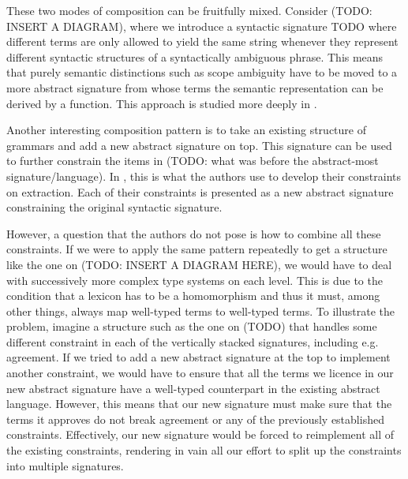 These two modes of composition can be fruitfully mixed. Consider (TODO:
INSERT A DIAGRAM), where we introduce a syntactic signature TODO where
different terms are only allowed to yield the same string whenever they
represent different syntactic structures of a syntactically ambiguous
phrase. This means that purely semantic distinctions such as scope
ambiguity have to be moved to a more abstract signature from whose terms
the semantic representation can be derived by a function. This approach
is studied more deeply in \cite{pogodalla2007generalizing}.

Another interesting composition pattern is to take an existing structure
of grammars and add a new abstract signature on top. This signature can
be used to further constrain the items in (TODO: what was before the
abstract-most signature/language). In \cite{pogodalla2012controlling},
this is what the authors use to develop their constraints on
extraction. Each of their constraints is presented as a new abstract
signature constraining the original syntactic signature.

However, a question that the authors do not pose is how to combine all
these constraints. If we were to apply the same pattern repeatedly to
get a structure like the one on (TODO: INSERT A DIAGRAM HERE), we would
have to deal with successively more complex type systems on each
level. This is due to the condition that a lexicon has to be a
homomorphism and thus it must, among other things, always map well-typed
terms to well-typed terms. To illustrate the problem, imagine a
structure such as the one on (TODO) that handles some different
constraint in each of the vertically stacked signatures, including
e.g. agreement. If we tried to add a new abstract signature at the top
to implement another constraint, we would have to ensure that all the
terms we licence in our new abstract signature have a well-typed
counterpart in the existing abstract language. However, this means that
our new signature must make sure that the terms it approves do not break
agreement or any of the previously established constraints. Effectively,
our new signature would be forced to reimplement all of the existing
constraints, rendering in vain all our effort to split up the
constraints into multiple signatures.

